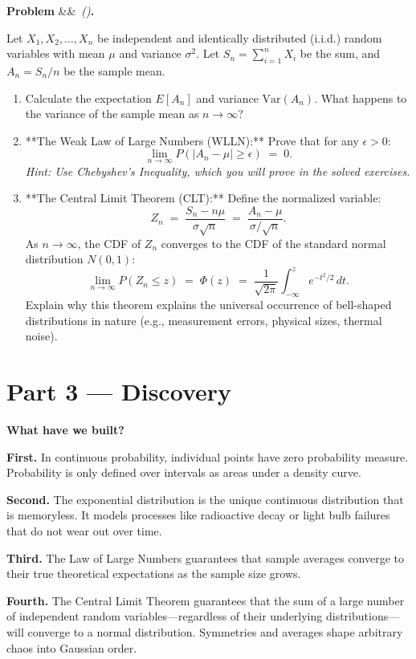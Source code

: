 \documentclass[12pt, a4paper]{article}
\newcounter{problem}
\newenvironment{problem}[1][]{%
  \refstepcounter{problem}%
  \par\vspace{6pt}%
  \noindent\textbf{\color{MidBlue}Problem \theproblem}%
  \ifx&#1&\else\ \textit{(#1)}\fi\textbf{.}\enskip
}{\par\vspace{4pt}}
\newcounter{exercise}
\begin{document}
\begin{problem}
\label{prob:limit_theorems}
Let $X_1, X_2, \ldots, X_n$ be independent and identically distributed (i.i.d.) random variables with mean $\mu$ and variance $\sigma^2$. Let $S_n = \sum_{i=1}^n X_i$ be the sum, and $A_n = S_n/n$ be the sample mean.
\begin{enumerate}[label=(\alph*), topsep=2pt]
  \item Calculate the expectation $E[A_n]$ and variance $\text{Var}(A_n)$. What happens to the variance of the sample mean as $n \to \infty$?
  \item **The Weak Law of Large Numbers (WLLN):** Prove that for any $\epsilon > 0$:
  \[
    \lim_{n\to\infty} P(|A_n - \mu| \ge \epsilon) \;=\; 0.
  \]
  \textit{Hint: Use Chebyshev's Inequality, which you will prove in the solved exercises.}
  \item **The Central Limit Theorem (CLT):** Define the normalized variable:
  \[
    Z_n \;=\; \frac{S_n - n\mu}{\sigma \sqrt{n}} \;=\; \frac{A_n - \mu}{\sigma / \sqrt{n}}.
  \]
  As $n \to \infty$, the CDF of $Z_n$ converges to the CDF of the standard normal distribution $N(0, 1)$:
  \[
    \lim_{n\to\infty} P(Z_n \le z) \;=\; \Phi(z) \;=\; \frac{1}{\sqrt{2\pi}} \int_{-\infty}^z e^{-t^2/2} \, dt.
  \]
  Explain why this theorem explains the universal occurrence of bell-shaped distributions in nature (e.g., measurement errors, physical sizes, thermal noise).
\end{enumerate}
\end{problem}

\newpage

\section{Part 3 \texorpdfstring{---}{--} Discovery}

\begin{discoverybox}
\textbf{What have we built?}

\textbf{First.} In continuous probability, individual points have zero probability measure. Probability is only defined over intervals as areas under a density curve.

\textbf{Second.} The exponential distribution is the unique continuous distribution that is memoryless. It models processes like radioactive decay or light bulb failures that do not wear out over time.

\textbf{Third.} The Law of Large Numbers guarantees that sample averages converge to their true theoretical expectations as the sample size grows.

\textbf{Fourth.} The Central Limit Theorem guarantees that the sum of a large number of independent random variables—regardless of their underlying distributions—will converge to a normal distribution. Symmetries and averages shape arbitrary chaos into Gaussian order.
\end{discoverybox}
\end{document}
